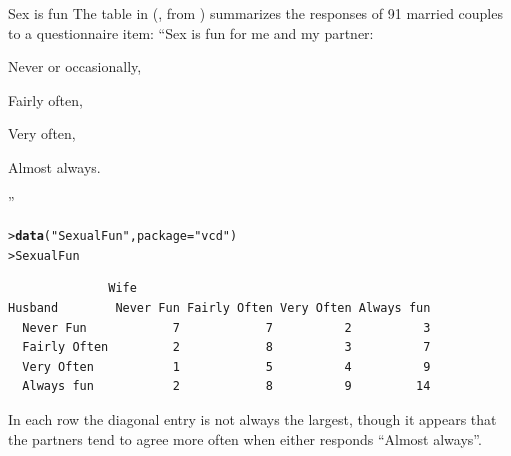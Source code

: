 \documentclass[10pt,krantz2]{krantz}\usepackage[]{graphicx}\usepackage[]{color}
\makeatletter
\newcommand{\hlstr}[1]{\textcolor[rgb]{0.192,0.494,0.8}{#1}}%
\newcommand{\hlstd}[1]{\textcolor[rgb]{0.345,0.345,0.345}{#1}}%
\newcommand{\hlkwc}[1]{\textcolor[rgb]{0.333,0.667,0.333}{#1}}%
\newcommand{\hlkwd}[1]{\textcolor[rgb]{0.737,0.353,0.396}{\textbf{#1}}}%
\newenvironment{kframe}{%
 \def\at@end@of@kframe{}%
 \ifinner\ifhmode%
  \def\at@end@of@kframe{\end{minipage}}%
  \begin{minipage}{\columnwidth}%
 \fi\fi%
 \def\FrameCommand##1{\hskip\@totalleftmargin \hskip-\fboxsep
 \colorbox{shadecolor}{##1}\hskip-\fboxsep
     \hskip-\linewidth \hskip-\@totalleftmargin \hskip\columnwidth}%
 \MakeFramed {\advance\hsize-\width
   \@totalleftmargin\z@ \linewidth\hsize
   \@setminipage}}%
 {\par\unskip\endMakeFramed%
 \at@end@of@kframe}
\newenvironment{knitrout}{}{} %
\renewenvironment{knitrout}{\small\renewcommand{\baselinestretch}{.85}}{} %
\makeatother
\begin{document}
\begin{Example}[sexisfun1]{Sex is fun}
The  table in 
(\citet[Table 2.10]{Agresti:90}, from \citet{Hout-etal:87})
 summarizes the responses of 91
married couples to a questionnaire item:
``Sex is fun for me and my partner:
\begin{seriate}
  \item Never or occasionally,
  \item Fairly often,
  \item Very often,
  \item Almost always.
\end{seriate}
''
\begin{knitrout}
\color{fgcolor}\begin{kframe}
\begin{alltt}
\hlstd{> }\hlkwd{data}\hlstd{(}\hlstr{"SexualFun"}\hlstd{,} \hlkwc{package} \hlstd{=} \hlstr{"vcd"}\hlstd{)}
\hlstd{> }\hlstd{SexualFun}
\end{alltt}
\begin{verbatim}
              Wife
Husband        Never Fun Fairly Often Very Often Always fun
  Never Fun            7            7          2          3
  Fairly Often         2            8          3          7
  Very Often           1            5          4          9
  Always fun           2            8          9         14
\end{verbatim}
\end{kframe}
\end{knitrout}

In each row the diagonal entry is not always the largest, though it
appears that the partners tend to agree more often when either responds
``Almost always''.
%
\end{Example}
\end{document}
